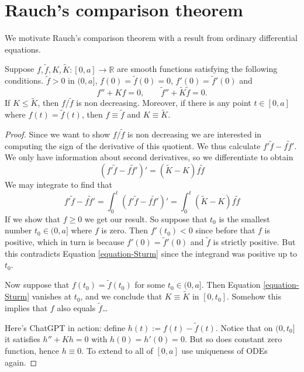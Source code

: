 \section{Rauch's comparison theorem}
\label{section-Rauch}

We motivate Rauch's comparison theorem with a result from ordinary
differential equations.

\begin{theorem}[Sturm]
\label{theorem-Sturm}
Suppose $f,\tilde{f},K,\tilde{K}:[0,a]\to \mathbb{R}$ are smooth functions
satisfying the following conditions. $\tilde{f} > 0$ in $(0,a]$, $f(0)=\tilde{f}(0)=0$,
$f'(0)=\tilde{f}'(0)$ and
$$
f''+Kf=0,\qquad \tilde{f}''+\tilde{K}\tilde{f}=0.
$$
If $K\leq \tilde{K}$, then $f/\tilde{f}$ is non decreasing. Moreover, if there
is any point $t \in [0,a]$ where $f(t)=\tilde{f}(t)$, then $f \equiv \tilde{f}$
and $K \equiv \tilde{K}$.
\end{theorem}

\begin{proof}
Since we want to show $f/\tilde{f}$ is non decreasing we are interested in
computing the sign of the derivative of this quotient. We thus calculate 
$f'\tilde{f}-f \tilde{f}'$. We only have information about second derivatives,
so we differentiate to obtain
$$
(f'\tilde{f}-f \tilde{f}')'=(\tilde{K}-K)f\tilde{f}
$$
We may integrate to find that 
\begin{equation}
\label{equation-Sturm}
f'\tilde{f}-f \tilde{f}'=\int_0^t (f'\tilde{f}-f \tilde{f}')'
=\int_0^t (\tilde{K}-K)f\tilde{f}
\end{equation}
If we show that $f\geq 0$ we get our result. So suppose that $t_0$ is the
smallest number $t_0 \in (0,a]$ where $f$ is zero. Then $f'(t_0)<0$ since before
that $f$ is positive, which in turn is because $f'(0)=\tilde{f}'(0)$ and
$\tilde{f}$ is strictly positive. But this contradicts Equation
\ref{equation-Sturm} since the integrand was positive up to $t_0$.

Now suppose that $f(t_0)=\tilde{f}(t_0)$ for some $t_0 \in (0,a]$. Then Equation
\ref{equation-Sturm} vanishes at $t_0$, and we conclude that $K \equiv
\tilde{K}$ in $[0,t_0]$. Somehow this implies that $f$ also equals $\tilde{f}$…

Here's ChatGPT in action: define $h(t):=f(t)-\tilde{f}(t)$. Notice that on
$(0,t_0]$ it satisfies $h''+Kh=0$ with $h(0)=h'(0)=0$. But so does constant zero
function, hence  $h\equiv0$. To extend to all of $[0,a]$ use uniqueness of
ODEs again.
\end{proof}

